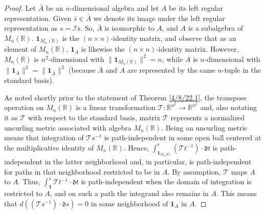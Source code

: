 \documentclass{amsart}
\numberwithin{equation}{section}
\theoremstyle{definition}
\numberwithin{theorem}{section}
\begin{document}
\begin{proof} 
Let $\bar{A}$ be an $n$-dimensional algebra and let $A$ be its left regular representation.  Given $\bar{s}\in\bar{A}$ we denote its image under the left regular representation as $s = \mathcal{I}\bar{s}$.
 So, $\bar{A}$ is isomorphic to $A$, and $A$ is a subalgebra of $ M_n(\mathbb{R})$.   $\mathbf{1}_{M_n(\mathbb{R})}$ is the $(n\times n)$-identity matrix, and observe that as an element of $ M_n(\mathbb{R})$, $\mathbf{1}_A$ is likewise the $(n\times n)$-identity matrix.  However, $ M_n(\mathbb{R})$ is $n^2$-dimensional with $\|\mathbf{1}_{M_n(\mathbb{R})}\|^2 = n$, while $A$ is $n$-dimensional with $\|\mathbf{1}_A\|^2 = \|\mathbf{1}_{\bar{A}}\|^2$ (because $\bar{A}$ and  $A$ are represented by the same $n$-tuple in the standard basis).   

As noted shortly prior to the statement of Theorem \ref{4/8/22.1}, the transpose operation on $ M_n(\mathbb{R})$ is a linear transformation $\mathcal{\mathcal{T}}:\mathbb{R}^{n^2}\rightarrow \mathbb{R}^{n^2}$ and, also notating it as $\mathcal{\mathcal{T}}$ with respect to the standard basis, matrix $\mathcal{\mathcal{T}}$ represents a normalized uncurling metric associated with algebra  $ M_n(\mathbb{R})$.  Being an uncurling metric means that integration of $\mathcal{\mathcal{T}}s^{-1}$ is path-independent in some open ball centered at the multiplicative identity of $ M_n(\mathbb{R})$.  
 Hence, $\int_{\mathbf{1}_{M_n({\mathbb{R})}}}^s (\mathcal{\mathcal{T}}t^{-1})\cdot \mathfrak{d}t$ is path-independent in the latter neighborhood and, in particular, is path-independent for paths in that neighborhood restricted to be in $A$.  By assumption, $\mathcal{\mathcal{T}}$ maps $A$ to $A$. 
 Thus, $\int_\mathbf{1}^s \mathcal{\mathcal{T}}t^{-1}\cdot \mathfrak{d}t$ is path-independent when the domain of integration is restricted to $A$, and on such a path the integrand also remains in $A$.  This means that 
  $d((\mathcal{\mathcal{T}}s^{-1})\cdot \mathfrak{d}s) = 0$ in some neighborhood of $\mathbf{1}_A$ in $A$.
  

\end{proof}
\end{document}
